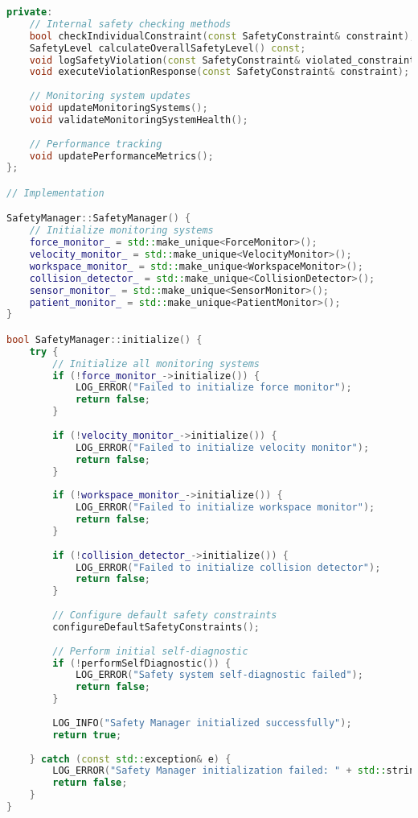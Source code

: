 \begin{lstlisting}[language=C++, caption={Safety Manager Core Implementation}, label={lst:app-safety-manager}]
private:
    // Internal safety checking methods
    bool checkIndividualConstraint(const SafetyConstraint& constraint);
    SafetyLevel calculateOverallSafetyLevel() const;
    void logSafetyViolation(const SafetyConstraint& violated_constraint);
    void executeViolationResponse(const SafetyConstraint& constraint);
    
    // Monitoring system updates
    void updateMonitoringSystems();
    void validateMonitoringSystemHealth();
    
    // Performance tracking
    void updatePerformanceMetrics();
};

// Implementation

SafetyManager::SafetyManager() {
    // Initialize monitoring systems
    force_monitor_ = std::make_unique<ForceMonitor>();
    velocity_monitor_ = std::make_unique<VelocityMonitor>();
    workspace_monitor_ = std::make_unique<WorkspaceMonitor>();
    collision_detector_ = std::make_unique<CollisionDetector>();
    sensor_monitor_ = std::make_unique<SensorMonitor>();
    patient_monitor_ = std::make_unique<PatientMonitor>();
}

bool SafetyManager::initialize() {
    try {
        // Initialize all monitoring systems
        if (!force_monitor_->initialize()) {
            LOG_ERROR("Failed to initialize force monitor");
            return false;
        }
        
        if (!velocity_monitor_->initialize()) {
            LOG_ERROR("Failed to initialize velocity monitor");
            return false;
        }
        
        if (!workspace_monitor_->initialize()) {
            LOG_ERROR("Failed to initialize workspace monitor");
            return false;
        }
        
        if (!collision_detector_->initialize()) {
            LOG_ERROR("Failed to initialize collision detector");
            return false;
        }
        
        // Configure default safety constraints
        configureDefaultSafetyConstraints();
        
        // Perform initial self-diagnostic
        if (!performSelfDiagnostic()) {
            LOG_ERROR("Safety system self-diagnostic failed");
            return false;
        }
        
        LOG_INFO("Safety Manager initialized successfully");
        return true;
        
    } catch (const std::exception& e) {
        LOG_ERROR("Safety Manager initialization failed: " + std::string(e.what()));
        return false;
    }
}


\end{lstlisting}
